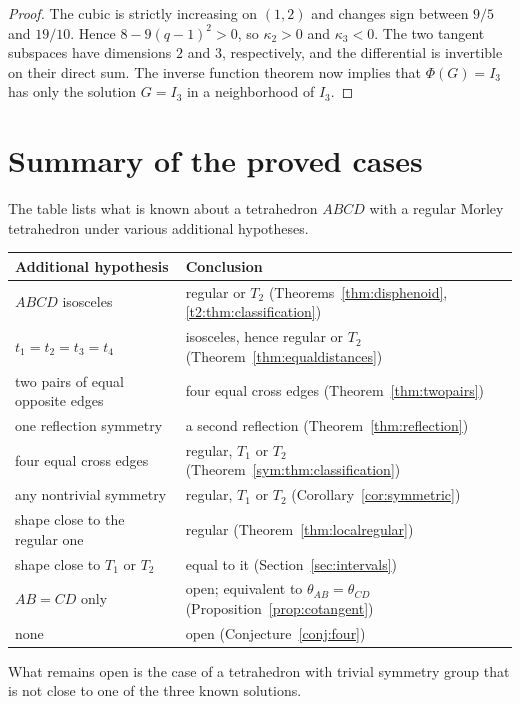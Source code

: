 \documentclass[11pt]{article}
\theoremstyle{definition}
\theoremstyle{remark}
\begin{document}
\begin{proof}
The cubic is strictly increasing on $(1,2)$ and changes sign between $9/5$ and $19/10$. Hence $8-9(q-1)^2>0$, so $\kappa_2>0$ and $\kappa_3<0$. The two tangent subspaces have dimensions $2$ and $3$, respectively, and the differential is invertible on their direct sum. The inverse function theorem now implies that $\Phi(G)=I_3$ has only the solution $G=I_3$ in a neighborhood of $I_3$.
\end{proof}

\section{Summary of the proved cases}
\label{sec:summary}

The table lists what is known about a tetrahedron $ABCD$ with a regular Morley tetrahedron under various additional hypotheses.

\begin{center}\small
\begin{tabular}{p{}p{}}\toprule
Additional hypothesis & Conclusion\\\midrule
$ABCD$ isosceles & regular or $T_2$ (Theorems~\ref{thm:disphenoid}, \ref{t2:thm:classification})\\
$t_1=t_2=t_3=t_4$ & isosceles, hence regular or $T_2$ (Theorem~\ref{thm:equaldistances})\\
two pairs of equal opposite edges & four equal cross edges (Theorem~\ref{thm:twopairs})\\
one reflection symmetry & a second reflection (Theorem~\ref{thm:reflection})\\
four equal cross edges & regular, $T_1$ or $T_2$ (Theorem~\ref{sym:thm:classification})\\
any nontrivial symmetry & regular, $T_1$ or $T_2$ (Corollary~\ref{cor:symmetric})\\
shape close to the regular one & regular (Theorem~\ref{thm:localregular})\\
shape close to $T_1$ or $T_2$ & equal to it (Section~\ref{sec:intervals})\\
$AB=CD$ only & open; equivalent to $\theta_{AB}=\theta_{CD}$ (Proposition~\ref{prop:cotangent})\\
none & open (Conjecture~\ref{conj:four})\\\bottomrule
\end{tabular}
\end{center}

What remains open is the case of a tetrahedron with trivial symmetry group that is not close to one of the three known solutions.
\end{document}
